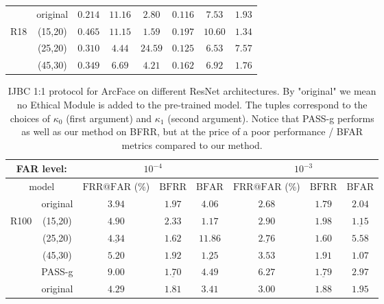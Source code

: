 \documentclass[nohyperref]{article}
\theoremstyle{plain}
\theoremstyle{definition}
\theoremstyle{remark}
\begin{document}
\begin{table*}
\begin{tabular}{ c | c | ccc | ccc}
                              & original  & $\mathbf{0.214}$ & $11.16$ & $2.80$ & $\mathbf{0.116}$  & $7.53$ & $1.93$ \\
  \multirow{2}{*}{R18}        & (15,20) & $0.465$ & $11.15$ & $\mathbf{1.59}$ & $0.197$  & $10.60$ & $\mathbf{1.34}$  \\
                              & (25,20) & $0.310$ & $\mathbf{4.44}$ & $24.59$ & $0.125$  & $\mathbf{6.53}$ & $7.57$ \\
                              & (45,30) & $0.349$ & $6.69$ & $4.21$ & $0.162$  & $6.92$ & $1.76$  \\ \hline 
\end{tabular}
\label{tab:table6}
\end{table*}

\begin{table}
\center
\caption{IJBC 1:1 protocol for ArcFace on different ResNet architectures. By "original" we mean no Ethical Module is added to the pre-trained model. The tuples correspond to the choices of $\kappa_0$ (first argument) and $\kappa_1$ (second argument). Notice that PASS-g performs as well as our method on BFRR, but at the price of a poor performance / BFAR metrics compared to our method.}
\begin{tabular}{ c | c | ccc | ccc}
 \multicolumn{2}{c}{ FAR level: }         & \multicolumn{3}{c}{ $10^{-4}$} & \multicolumn{3}{c}{ $10^{-3}$} \\ 
 \hline \hline
  \multicolumn{2}{c}{model}    & $\mathrm{FRR}@\mathrm{FAR}$ (\%)  & $\mathrm{BFRR}$  & $\mathrm{BFAR}$  & $\mathrm{FRR}@\mathrm{FAR}$ (\%)  & $\mathrm{BFRR}$        & $\mathrm{BFAR}$        \\ \hline
                              & original  & $\mathbf{3.94}$ & $1.97$ & $4.06$ &  $\mathbf{2.68}$ & $1.79$ & $2.04$  \\
  \multirow{2}{*}{R100}        & (15,20) & $4.90$ & $2.33$ & $\mathbf{1.17}$ &  $2.90$ & $1.98$ & $\underline{1.15}$  \\
                              & (25,20) & $\underline{4.34}$ & $\mathbf{1.62}$ & $11.86$&  $\underline{2.76}$ & $\mathbf{1.60}$ & $5.58$  \\
                              & (45,30) & $5.20$ & $1.92$ & $\underline{1.25}$ &  $3.53$ & $1.91$ & $\mathbf{1.07}$  \\ 
                              & PASS-g & $9.00$ & $\underline{1.70}$ & $4.49$ &  $6.27$ & $\underline{1.79}$ & $2.97$  \\ \hline     
                              & original  & $\mathbf{4.29}$ & $1.81$ & $3.41$ &  $\mathbf{3.00}$ & $1.88$ & $1.95$  \\

\end{tabular}
\end{table}
\end{document}
